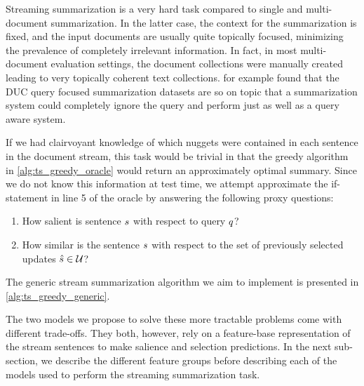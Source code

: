 Streaming summarization is a very hard task compared to single and 
multi-document summarization. In the latter case, the context for the 
summarization is fixed, and the input documents are usually quite 
topically focused, minimizing the prevalence of completely irrelevant 
information. In fact, in most multi-document evaluation settings, the
document collections were manually created leading to very topically
coherent text collections. 
\cite{baumel2016topic} for example found that the DUC
query focused summarization datasets are so on topic that a summarization
system could completely ignore the query and perform just as well as a
query aware system.



If we had clairvoyant knowledge of which nuggets were contained in each
sentence in the document stream,
this task would be trivial in that the greedy algorithm in 
\autoref{alg:ts_greedy_oracle} would return an approximately optimal summary.
Since we do not know this information at test time, we attempt approximate
the if-statement in line 5 of the oracle by answering the following proxy 
questions:
\begin{enumerate}
    \item How salient is sentence $s$ with respect to query $q$?
    \item How similar is the sentence $s$ with respect to the set of 
            previously selected updates $\hat{s} \in \mathcal{U}$?
\end{enumerate}
The generic stream summarization algorithm we aim to implement is presented
in \autoref{alg:ts_greedy_generic}.

The two models we propose to solve these more tractable problems come with
different trade-offs. They both, however, rely on a feature-base 
representation of the stream sentences to make salience and selection 
predictions. In the next sub-section, we describe the different feature
groups before describing each of the models used to perform the streaming
summarization task.
